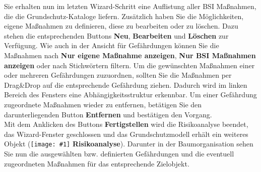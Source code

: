 \documentclass[a4paper,10pt]{book}
\newcommand{\icon}[1]{\texttt{[image: \#1]}}
\begin{document}
\newline
Sie erhalten nun im letzten Wizard-Schritt eine Auflistung aller BSI Maßnahmen, die die Grundschutz-Kataloge liefern.
Zusätzlich haben Sie die Möglichkeiten, eigene Maßnahmen zu definieren, diese zu bearbeiten oder zu löschen.
Dazu stehen die entsprechenden Buttons \textbf{Neu}, \textbf{Bearbeiten} und \textbf{Löschen} zur Verfügung.
Wie auch in der Ansicht für Gefährdungen können Sie die Maßnahmen nach \textbf{Nur eigene Maßnahme anzeigen},
\textbf{Nur BSI Maßnahmen anzeigen} oder nach Stichwörtern filtern. Um die gewünschten Maßnahmen einer oder
mehreren Gefährdungen zuzuordnen, sollten Sie die Maßnahmen per {Drag\&Drop} auf die entsprechende Gefährdung ziehen.
Dadurch wird im linken Bereich des Fensters eine Abhängigkeitsstruktur erkennbar. Um einer Gefährdung zugeordnete
Maßnahmen wieder zu entfernen, betätigen Sie den darunterliegenden Button \textbf{Entfernen} und bestätigen den Vorgang.
\newline\\
Mit dem Anklicken des Buttons \textbf{Fertigstellen} wird die Risikoanalyse beendet, das Wizard-Fenster geschlossen und das Grundschutzmodell erhält ein weiteres Objekt (\icon{Icon/Risikoanalyse.png} \textbf{Risikoanalyse}). Darunter in der Baumorganisation sehen Sie nun die ausgewählten bzw. definierten Gefährdungen und die eventuell zugeordneten Maßnahmen für das entsprechende Zielobjekt.
\end{document}
